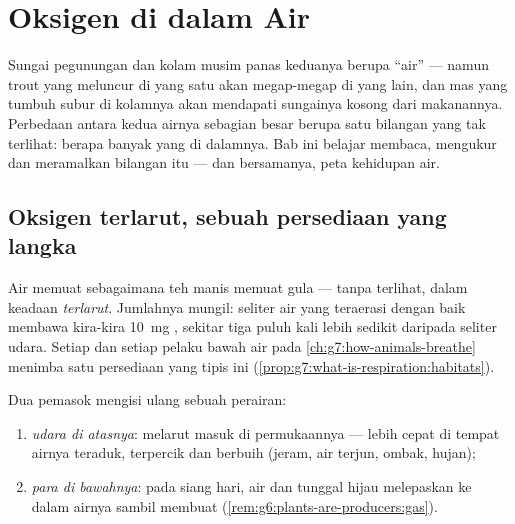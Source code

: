 \chapter{Oksigen di dalam Air}\label{ch:g7:oxygen-in-the-water}

Sungai pegunungan dan kolam musim panas keduanya berupa ``air'' ---
namun  trout yang meluncur di yang satu akan megap-megap di yang
lain, dan  mas yang tumbuh subur di kolamnya akan mendapati
sungainya kosong dari makanannya. Perbedaan antara kedua airnya
sebagian besar berupa satu bilangan yang tak terlihat: berapa banyak
 yang  di dalamnya. Bab ini belajar membaca, mengukur
dan meramalkan bilangan itu --- dan bersamanya, peta kehidupan air.

\section{Oksigen terlarut, sebuah persediaan yang langka}

\begin{definition}\label{def:g7:oxygen-in-the-water:dissolved}
Air memuat  sebagaimana teh manis memuat gula --- tanpa
terlihat, dalam keadaan \emph{terlarut}.
Jumlahnya mungil: seliter air yang teraerasi dengan baik membawa
kira-kira \qty{10}{mg} , sekitar tiga puluh kali lebih sedikit
daripada seliter udara. Setiap  dan setiap pelaku 
bawah air pada \cref{ch:g7:how-animals-breathe} menimba satu
persediaan yang tipis ini
(\cref{prop:g7:what-is-respiration:habitats}).
\end{definition}

\begin{proposition}\label{prop:g7:oxygen-in-the-water:fills}
Dua pemasok mengisi ulang  sebuah perairan:
\begin{enumerate}
  \item \emph{udara di atasnya}:  melarut masuk di permukaannya
        --- lebih cepat di tempat airnya teraduk, terpercik dan
        berbuih (jeram, air terjun, ombak, hujan);
  \item \emph{para  di bawahnya}: pada siang hari, 
        air dan  tunggal hijau melepaskan  ke dalam airnya
        sambil membuat
        (\cref{rem:g6:plants-are-producers:gas}).
\end{enumerate}
\end{proposition}
\admitted

